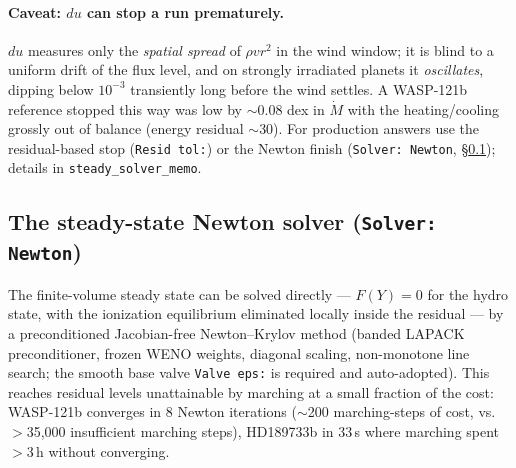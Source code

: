 \documentclass[english,a4paper]{kiseon_memo}
\begin{document}
\paragraph{Caveat: $du$ can stop a run prematurely.} $du$ measures only the
\emph{spatial spread} of $\rho v r^2$ in the wind window; it is blind to a
uniform drift of the flux level, and on strongly irradiated planets it
\emph{oscillates}, dipping below $10^{-3}$ transiently long before the wind
settles. A WASP-121b reference stopped this way was low by $\sim$0.08 dex in
$\dot M$ with the heating/cooling grossly out of balance (energy residual
$\sim$30). For production answers use the residual-based stop
(\texttt{Resid tol:}) or the Newton finish (\texttt{Solver: Newton},
\S\ref{sec:newton}); details in \texttt{steady\_solver\_memo}.

\subsection{The steady-state Newton solver (\texttt{Solver: Newton})}
\label{sec:newton}
The finite-volume steady state can be solved directly --- $F(Y)=0$ for the hydro
state, with the ionization equilibrium eliminated locally inside the residual ---
by a preconditioned Jacobian-free Newton--Krylov method (banded LAPACK
preconditioner, frozen WENO weights, diagonal scaling, non-monotone line search;
the smooth base valve \texttt{Valve eps:} is required and auto-adopted). This
reaches residual levels unattainable by marching at a small fraction of the cost:
WASP-121b converges in 8 Newton iterations ($\sim$200 marching-steps of cost,
vs.\ $>$35{,}000 insufficient marching steps), HD189733b in 33\,s where marching
spent $>$3\,h without converging.
\end{document}

